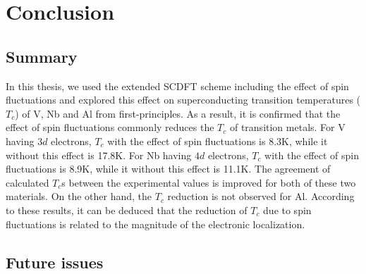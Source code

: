 

%
%
\chapter{Conclusion}
\label{conclusion}

\section{Summary}
In this thesis, we used the extended SCDFT scheme including the effect of spin fluctuations
and explored this effect on superconducting transition temperatures ($T_c$)
of V, Nb and Al from first-principles. 
As a result, it is confirmed that the effect of spin fluctuations commonly
reduces the $T_c$ of transition metals. 
For V having $3d$ electrons, $T_c$ with the effect of spin fluctuations is 8.3K, while it 
without this effect is 17.8K.
For Nb having $4d$ electrons, $T_c$ with the effect of spin fluctuations is 8.9K, while it 
without this effect is 11.1K.
The agreement of calculated $T_c$s between the experimental values is improved for both of these 
two materials. On the other hand, the $T_c$ reduction is not observed for Al.
According to these results, it can be deduced that the reduction of $T_c$ due to spin fluctuations
is related to the magnitude of the electronic localization.

\section{Future issues}

